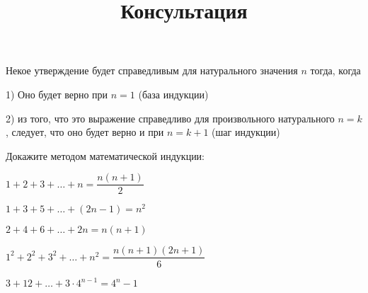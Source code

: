 \title{Консультация}
Некое утверждение будет справедливым для натурального значения \( n \) тогда, когда

1) Оно будет верно при \( n=1 \) (база индукции)

2) из того, что это выражение справедливо для произвольного натурального \( n=k \), следует, что оно будет верно и при \( n=k+1 \) (шаг индукции)
\begin{listofex}
	\item Докажите методом математической индукции:
	\begin{enumcols}[itemcolumns=2]
		\item \( 1+2+3+\dots+n=\dfrac{n(n+1)}{2} \)
		\item \( 1+3+5+\dots+(2n-1)=n^2 \)
		\item \( 2+4+6+\dots+2n=n(n+1) \)
		\item \( 1^2+2^2+3^2+\dots+n^2=\dfrac{n(n+1)(2n+1)}{6} \)
		\item \( 3+12+\dots+3\cdot4^{n-1}=4^n-1 \)
	\end{enumcols}
	
	
\end{listofex}